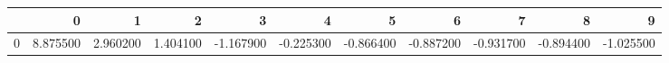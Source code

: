 \begin{tabular}{lrrrrrrrrrr}
\toprule
 & 0 & 1 & 2 & 3 & 4 & 5 & 6 & 7 & 8 & 9 \\
\midrule
0 & 8.875500 & 2.960200 & 1.404100 & -1.167900 & -0.225300 & -0.866400 & -0.887200 & -0.931700 & -0.894400 & -1.025500 \\
\bottomrule
\end{tabular}
